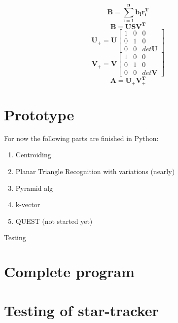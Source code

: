 \documentclass[12pt,a4paper,oneside]{article}
\begin{document}
\cite{6187242}
\begin{equation}
\bm{B = \sum_{i=1}^nb_ir_i^T}
\end{equation}
\begin{equation}
\bm{B = USV^T}
\end{equation}
\begin{equation}
\bm{U}_+ = \bm{U}\begin{bmatrix}
1 & 0 & 0 \\
0 & 1 & 0 \\
0 & 0 & det\bm{U}
\end{bmatrix}
\end{equation}
\begin{equation}
\bm{V}_+ = \bm{V}\begin{bmatrix}
1 & 0 & 0 \\
0 & 1 & 0 \\
0 & 0 & det\bm{V}
\end{bmatrix}
\end{equation}
\begin{equation}
\bm{A = U_+V_+^T}
\end{equation}
\newpage
\section{Prototype}
For now the following parts are finished in Python:
\begin{enumerate}
\item Centroiding
\item Planar Triangle Recognition with variations (nearly)
\item Pyramid alg
\item k-vector
\item QUEST (not started yet)
\end{enumerate}
Testing\par
\cite{kruijff2003star}
\newpage
\section{Complete program}

\newpage
\section{Testing of star-tracker}
\cite{RIS_0}

\newpage






\newpage

\listoftables
\end{document}
